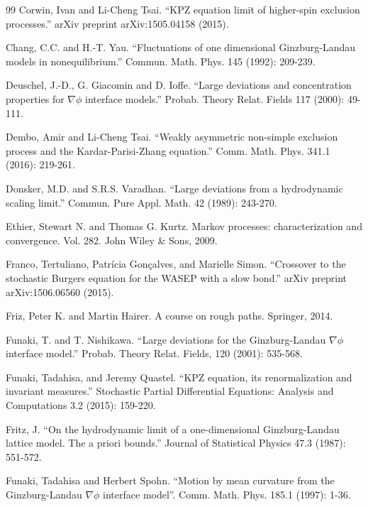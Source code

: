 \documentclass[11pt, a4paper]{article}
\newcommand{\1}{\mathbf{1}}
\begin{document}
\begin{thebibliography}{99}
     Corwin, Ivan and Li-Cheng Tsai. ``KPZ equation limit of higher-spin exclusion processes.'' arXiv preprint arXiv:1505.04158 (2015).

     Chang, C.C. and H.-T. Yau. ``Fluctuations of one dimensional Ginzburg-Landau models in nonequilibrium.'' Commun. Math. Phys. 145 (1992): 209-239.
     
    Deuschel, J.-D., G. Giacomin and D. Ioffe. ``Large deviations and concentration properties for $\nabla \phi$ interface models.'' Probab. Theory Relat. Fields 117 (2000): 49-111.
    
     Dembo, Amir and Li-Cheng Tsai. ``Weakly asymmetric non-simple exclusion process and the Kardar-Parisi-Zhang equation.'' Comm. Math. Phys. 341.1 (2016): 219-261.

    Donsker, M.D. and S.R.S. Varadhan. ``Large deviations from a hydrodynamic scaling limit.'' Commun. Pure Appl. Math. 42 (1989): 243-270.

    Ethier, Stewart N. and Thomas G. Kurtz. Markov processes: characterization and convergence. Vol. 282. John Wiley \& Sons, 2009.
    
    Franco, Tertuliano, Patr\'icia Gon\c calves, and Marielle Simon. ``Crossover to the stochastic Burgers equation for the WASEP with a slow bond.'' arXiv preprint arXiv:1506.06560 (2015).
    
    Friz, Peter K. and Martin Hairer. A course on rough paths. Springer, 2014.
    
      Funaki, T. and T. Nishikawa. ``Large deviations for the Ginzburg-Landau $\nabla \phi$ interface model.'' Probab. Theory Relat. Fields, 120 (2001): 535-568.
      
     Funaki, Tadahisa, and Jeremy Quastel. ``KPZ equation, its renormalization and invariant measures.'' Stochastic Partial Differential Equations: Analysis and Computations 3.2 (2015): 159-220.
    
     Fritz, J. ``On the hydrodynamic limit of a one-dimensional Ginzburg-Landau lattice model. The a priori bounds.'' Journal of Statistical Physics 47.3 (1987): 551-572.

     Funaki, Tadahisa and Herbert Spohn. ``Motion by mean curvature from the {G}inzburg-{L}andau {$\nabla\phi$} interface model''. Comm. Math. Phys. 185.1 (1997): 1-36.
     

\end{thebibliography}
\end{document}
